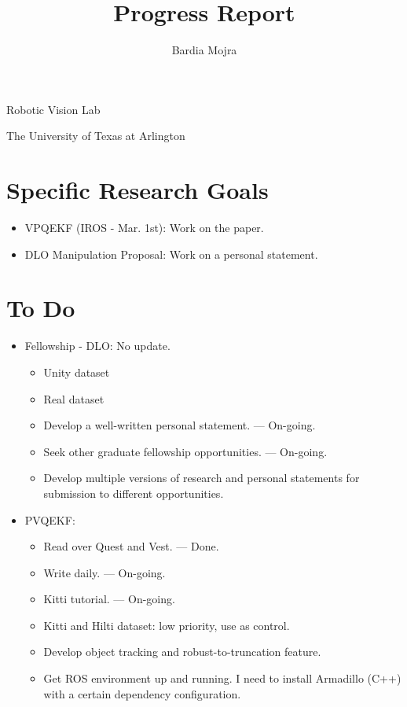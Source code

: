\documentclass[11pt]{article}
\title{Progress Report}
\author{Bardia Mojra}
\begin{document}
\maketitle
\thispagestyle{empty}

\bigskip
\bigskip
\begin{center}
      Robotic Vision Lab
\end{center}

\begin{center}
      The University of Texas at Arlington
\end{center}

\newpage

\section{Specific Research Goals}
\begin{itemize}
      \item VPQEKF (IROS - Mar. 1st): Work on the paper.
      \item DLO Manipulation Proposal: Work on a personal statement.
\end{itemize}

\section{To Do}
\begin{itemize}
  \item Fellowship - DLO: No update.
  \begin{itemize}
      \item Unity dataset
      \item Real dataset
      \item Develop a well-written personal statement. --- On-going.
      \item Seek other graduate fellowship opportunities. --- On-going.
      \item Develop multiple versions of research and personal statements for
      submission to different opportunities.
  \end{itemize}
  \item PVQEKF:
  \begin{itemize}
      \item Read over Quest and Vest. --- Done.
      \item Write daily. --- On-going.
      \item Kitti tutorial. --- On-going.
      \item Kitti and Hilti dataset: low priority, use as control.
      \item Develop object tracking and robust-to-truncation feature.
      \item Get ROS environment up and running. I need to install Armadillo (C++) with a certain dependency configuration.
  \end{itemize}
\end{itemize}
\end{document}
